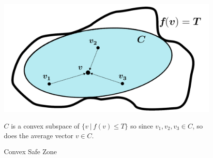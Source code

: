 \documentclass[10pt, conference]{IEEEtran}
\begin{document}
\begin{figure}[h]
\begin{center}
\includegraphics[width=0.85\linewidth]{Pics/PNGs/ConvexSafeZone.png}
\end{center}
\caption{Convex Safe Zone}
\label{fig:ConvexSafeZoneSketch}
\medskip
\small
$C$ is a convex subspace of ${\{v \ | \ f(v) \leq T\}}$ so since ${v_1,v_2,v_3 \in C}$, so does the average vector $v \in C$.
\end{figure}
\end{document}
